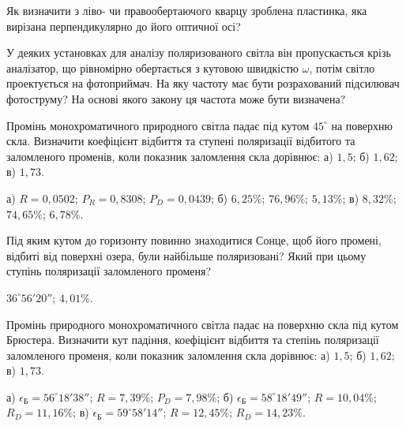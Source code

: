 \begin{problem}%
    Як визначити з ліво- чи правообертаючого кварцу зроблена пластинка,
    яка вирізана перпендикулярно до його оптичної осі?
\end{problem}

\begin{problem}%
     У деяких установках для аналізу поляризованого світла він пропускається крізь аналізатор, що рівномірно обертається з кутовою швидкістю $ \omega $, потім світло проектується на фотоприймач. На яку частоту має бути розрахований підсилювач фотоструму? На основі якого закону ця частота може бути визначена?
\end{problem}

\begin{problem}%
    Промінь монохроматичного природного світла падає під кутом $ 45^\circ $ на поверхню скла. Визначити коефіцієнт відбиття та ступені поляризації відбитого та заломленого променів, коли показник заломлення скла дорівнює: а) $ 1,5 $; б) $ 1,62 $; в) $ 1,73 $.
    \begin{solution}
      а) $ R = 0,0502 $; $ P_R = 0,8308 $; $ P_D = 0,0439 $; б) $ 6,25 \% $; $ 76,96 \% $; $ 5,13 \% $; в) $ 8,32 \% $; $ 74,65 \% $; $ 6,78 \% $.
    \end{solution}
\end{problem}

\begin{problem}%
    Під яким кутом до горизонту повинно знаходитися Сонце, щоб його промені, відбиті від поверхні озера, були найбільше поляризовані? Який при цьому ступінь поляризації заломленого променя?
    \begin{solution}
        $ 36^\circ56'20'' $; $ 4,01 \% $.
    \end{solution}
\end{problem}

\begin{problem}%
     Промінь природного монохроматичного світла падає на поверхню скла під кутом Брюстера. Визначити кут падіння, коефіцієнт відбиття та степінь поляризації заломленого променя, коли показник заломлення скла дорівнює: а) $ 1,5 $; б) $ 1,62 $; в) $ 1,73 $.
    \begin{solution}
        а) $ \epsilon_\text{Б} = 56^\circ 18' 38'' $; $ R = 7,39 \% $; $ P_D = 7,98 \% $; б) $ \epsilon_\text{Б} = 58^\circ 18' 49'' $; $ R =  10,04 \%$; $ R_D = 11,16 \% $; в) $ \epsilon_\text{Б} = 59^\circ 58' 14'' $; $ R =  12,45 \%$; $ R_D = 14,23 \% $.
    \end{solution}
\end{problem}




